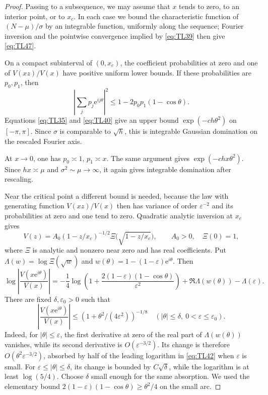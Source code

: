 \begin{proof}
Passing to a subsequence, we may assume that \(x\) tends to zero, to an
interior point, or to \(x_c\). In each case we bound the characteristic
function of \((N-\mu)/\sigma\) by an integrable function, uniformly along
the sequence; Fourier inversion and the pointwise convergence implied by
\eqref{eq:TL39} then give \eqref{eq:TL47}.

On a compact subinterval of \((0,x_c)\), the coefficient probabilities
at zero and one of \(V(xz)/V(x)\) have positive uniform lower bounds. If
these probabilities are \(p_0,p_1\), then \begin{equation}
\left|\sum_jp_j\mathrm{e}^{ij\theta}\right|^2
 \le1-2p_0p_1(1-\cos\theta).
 \label{eq:TL40}
\end{equation} Equations \eqref{eq:TL35} and \eqref{eq:TL40} give an upper bound
\(\exp(-c h\theta^2)\) on \([-\pi,\pi]\). Since \(\sigma\) is comparable
to \(\sqrt h\), this is integrable Gaussian domination on the rescaled
Fourier axis.

At \(x\to0\), one has \(p_0\asymp1\), \(p_1\asymp x\). The same argument
gives \(\exp(-c h x\theta^2)\). Since \(hx\asymp\mu\) and
\(\sigma^2\sim\mu\to\infty\), it again gives integrable domination after
rescaling.

Near the critical point a different bound is needed, because the law
with generating function \(V(xz)/V(x)\) then has variance of order
\(\varepsilon^{-2}\) and its probabilities at zero and one tend to zero. Quadratic
analytic inversion at \(x_c\) gives \begin{equation}
V(z)=A_0(1-z/x_c)^{-1/2}
 \Xi\bigl(\sqrt{1-z/x_c}\bigr),\qquad
 A_0>0,\quad \Xi(0)=1,
 \label{eq:TL41}
\end{equation} where \(\Xi\) is analytic and nonzero near zero and has real
coefficients. Put \(\Lambda(w)=\log \Xi(\sqrt w)\) and
\(w(\theta)=1-(1-\varepsilon)\mathrm{e}^{i\theta}\). Then \begin{equation}
\log\left|\frac{V(x\mathrm{e}^{i\theta})}{V(x)}\right|
 =-\frac14\log\left(1+
 \frac{2(1-\varepsilon)(1-\cos\theta)}{\varepsilon^2}\right)
 +\Re \Lambda(w(\theta))-\Lambda(\varepsilon).
 \label{eq:TL42}
\end{equation} There are fixed \(\delta,\varepsilon_0>0\) such that \begin{equation}
\left|\frac{V(x\mathrm{e}^{i\theta})}{V(x)}\right|
 \le(1+\theta^2/(4\varepsilon^2))^{-1/8}
 \quad(|\theta|\le\delta,\ 0<\varepsilon\le\varepsilon_0).
 \label{eq:TL43}
\end{equation} Indeed, for \(|\theta|\le\varepsilon\), the first derivative at zero
of the real part of \(\Lambda(w(\theta))\) vanishes, while its second
derivative is \(O(\varepsilon^{-3/2})\). Its change is therefore
\(O(\theta^2\varepsilon^{-3/2})\), absorbed by half of the leading
logarithm in \eqref{eq:TL42} when \(\varepsilon\) is small. For
\(\varepsilon\le|\theta|\le\delta\), its change is bounded by
\(C\sqrt\delta\), while the logarithm is at least \(\log(5/4)\). Choose
\(\delta\) small enough for the same absorption. We used the elementary
bound \(2(1-\varepsilon)(1-\cos\theta)\ge\theta^2/4\) on the small arc.


\end{proof}
